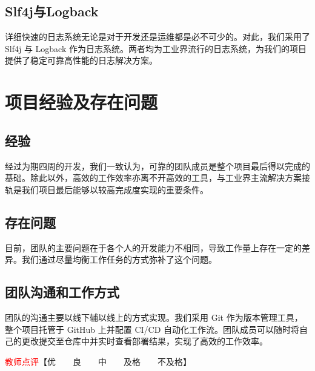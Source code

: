 \documentclass{article}
\begin{document}
\subsection{Slf4j与Logback}

详细快速的日志系统无论是对于开发还是运维都是必不可少的。对此，我们采用了 Slf4j 与 Logback 作为日志系统。两者均为工业界流行的日志系统，为我们的项目提供了稳定可靠高性能的日志解决方案。

\section{项目经验及存在问题}

\subsection{经验}

经过为期四周的开发，我们一致认为，可靠的团队成员是整个项目最后得以完成的基础。除此以外，高效的工作效率亦离不开高效的工具，与工业界主流解决方案接轨是我们项目最后能够以较高完成度实现的重要条件。

\subsection{存在问题}

目前，团队的主要问题在于各个人的开发能力不相同，导致工作量上存在一定的差异。我们通过尽量均衡工作任务的方式弥补了这个问题。

\subsection{团队沟通和工作方式}

团队的沟通主要以线下辅以线上的方式实现。我们采用 Git 作为版本管理工具，整个项目托管于 GitHub 上并配置 CI/CD 自动化工作流。团队成员可以随时将自己的更改提交至仓库中并实时查看部署结果，实现了高效的工作效率。


\vfill
\noindent\textcolor{red}{教师点评}【优~~~~良~~~~中~~~~及格~~~~不及格】
\end{document}
